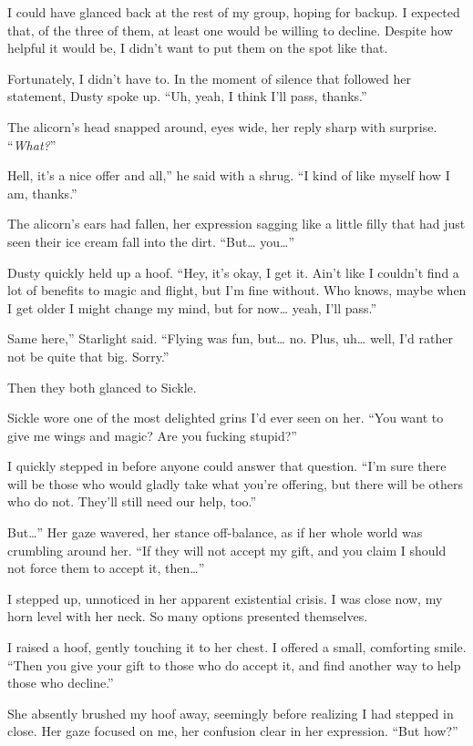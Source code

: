 I could have glanced back at the rest of my group, hoping for backup. I expected that, of the three of them, at least one would be willing to decline. Despite how helpful it would be, I didn’t want to put them on the spot like that.

Fortunately, I didn’t have to. In the moment of silence that followed her statement, Dusty spoke up. “Uh, yeah, I think I’ll pass, thanks.”

The alicorn’s head snapped around, eyes wide, her reply sharp with surprise. “\textit{What?}”

\leavevmode{}Hell, it’s a nice offer and all,” he said with a shrug. “I kind of like myself how I am, thanks.”

The alicorn’s ears had fallen, her expression sagging like a little filly that had just seen their ice cream fall into the dirt. “But… you…”

Dusty quickly held up a hoof. “Hey, it’s okay, I get it. Ain’t like I couldn’t find a lot of benefits to magic and flight, but I’m fine without. Who knows, maybe when I get older I might change my mind, but for now… yeah, I’ll pass.”

\leavevmode{}Same here,” Starlight said. “Flying was fun, but… no. Plus, uh… well, I’d rather not be quite that big. Sorry.”

Then they both glanced to Sickle.

Sickle wore one of the most delighted grins I’d ever seen on her. “You want to give me wings and magic? Are you fucking stupid?”

I quickly stepped in before anyone could answer that question. “I’m sure there will be those who would gladly take what you’re offering, but there will be others who do not. They’ll still need our help, too.”

\leavevmode{}But…” Her gaze wavered, her stance off-balance, as if her whole world was crumbling around her. “If they will not accept my gift, and you claim I should not force them to accept it, then…”

I stepped up, unnoticed in her apparent existential crisis. I was close now, my horn level with her neck. So many options presented themselves.

I raised a hoof, gently touching it to her chest. I offered a small, comforting smile. “Then you give your gift to those who do accept it, and find another way to help those who decline.”

She absently brushed my hoof away, seemingly before realizing I had stepped in close. Her gaze focused on me, her confusion clear in her expression. “But how?”

